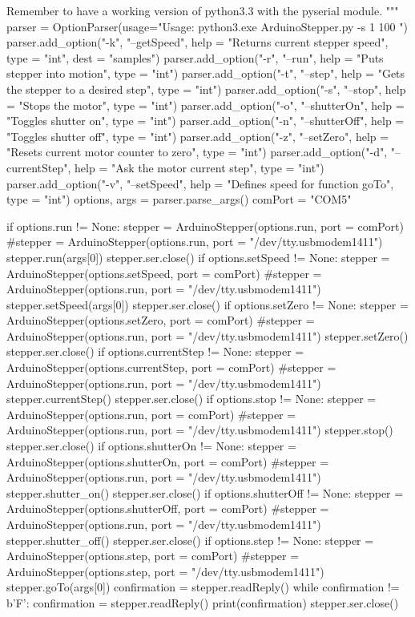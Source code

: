 \begin{python}
    Remember to have a working version of python3.3 with the 
    pyserial module.
    """
    parser = OptionParser(usage="Usage: python3.exe ArduinoStepper.py -s 1 100  ")
    parser.add_option("-k", "--getSpeed", help = "Returns current stepper speed", type = "int", dest = "samples")
    parser.add_option("-r", "--run", help = "Puts stepper into motion", type = "int")
    parser.add_option("-t", "--step", help = "Gets the stepper to a desired step", type = "int")
    parser.add_option("-s", "--stop", help = "Stops the motor", type = "int")
    parser.add_option("-o", "--shutterOn", help = "Toggles shutter on", type = "int")
    parser.add_option("-n", "--shutterOff", help = "Toggles shutter off", type = "int")
    parser.add_option("-z", "--setZero", help = "Resets current motor counter to zero", type = "int")
    parser.add_option("-d", "--currentStep", help = "Ask the motor current step", type = "int")
    parser.add_option("-v", "--setSpeed", help = "Defines speed for function goTo", type = "int")
    options, args = parser.parse_args()
    comPort = "COM5"
    
    if options.run != None:       
        stepper = ArduinoStepper(options.run, port = comPort)
        #stepper = ArduinoStepper(options.run, port = "/dev/tty.usbmodem1411")
        stepper.run(args[0])
        stepper.ser.close()
    if options.setSpeed != None:
        stepper = ArduinoStepper(options.setSpeed, port = comPort)
        #stepper = ArduinoStepper(options.run, port = "/dev/tty.usbmodem1411")
        stepper.setSpeed(args[0])
        stepper.ser.close()
    if options.setZero != None:
        stepper = ArduinoStepper(options.setZero, port = comPort)
        #stepper = ArduinoStepper(options.run, port = "/dev/tty.usbmodem1411")
        stepper.setZero()
        stepper.ser.close()
    if options.currentStep != None:
        stepper = ArduinoStepper(options.currentStep, port = comPort)
        #stepper = ArduinoStepper(options.run, port = "/dev/tty.usbmodem1411")
        stepper.currentStep()
        stepper.ser.close()
    if options.stop != None:
        stepper = ArduinoStepper(options.run, port = comPort)
        #stepper = ArduinoStepper(options.run, port = "/dev/tty.usbmodem1411")
        stepper.stop()
        stepper.ser.close()
    if options.shutterOn != None:
        stepper = ArduinoStepper(options.shutterOn, port = comPort)
        #stepper = ArduinoStepper(options.run, port = "/dev/tty.usbmodem1411")
        stepper.shutter_on()
        stepper.ser.close()
    if options.shutterOff != None:
        stepper = ArduinoStepper(options.shutterOff, port = comPort)
        #stepper = ArduinoStepper(options.run, port = "/dev/tty.usbmodem1411")
        stepper.shutter_off()
        stepper.ser.close()
    if options.step != None:
        stepper = ArduinoStepper(options.step, port = comPort)
        #stepper = ArduinoStepper(options.step, port = "/dev/tty.usbmodem1411")
        stepper.goTo(args[0])
        confirmation = stepper.readReply()
        while confirmation != b'F':
            confirmation = stepper.readReply()
        print(confirmation)
        stepper.ser.close()
\end{python}



